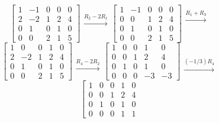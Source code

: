 \documentclass{ximera}
\begin{document}
\begin{exploration}
$$\left[\begin{array}{cccc|c}  
 1&-1&0&0&0\\2&-2&1&2&4\\0&1&0&1&0\\0&0&2&1&5
 \end{array}\right]
 \begin{array}{c}
 \\
 \xrightarrow{R_2-2R_1}\\
\\
\\
 \end{array}
 \left[\begin{array}{cccc|c}  
 1&-1&0&0&0\\0&0&1&2&4\\0&1&0&1&0\\0&0&2&1&5
 \end{array}\right]
 \begin{array}{c}
 \xrightarrow{R_1+R_3}\\
 \\
\\
\\
 \end{array}$$
 $$\left[\begin{array}{cccc|c}  
 1&0&0&1&0\\2&-2&1&2&4\\0&1&0&1&0\\0&0&2&1&5
 \end{array}\right]
 \begin{array}{c}
 \\
 \\
\\
\xrightarrow{R_4-2R_2}\\
 \end{array}
 \left[\begin{array}{cccc|c}  
 1&0&0&1&0\\0&0&1&2&4\\0&1&0&1&0\\0&0&0&-3&-3
 \end{array}\right]
 \begin{array}{c}
 \\
 \\
\\
\xrightarrow{(-1/3)R_4}\\
 \end{array}$$
 $$\left[\begin{array}{cccc|c}  
 1&0&0&1&0\\0&0&1&2&4\\0&1&0&1&0\\0&0&0&1&1

\end{array}$$
\end{exploration}
\end{document}
